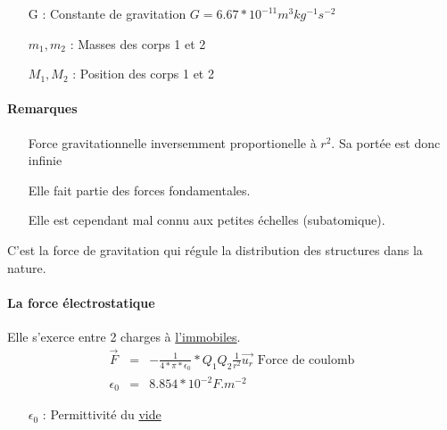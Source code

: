\begin{itemize}
	\item[G :] Constante de gravitation $G=6.67*10^{-11} m^3kg^{-1}s^{-2}$
	\item[$m_1, m_2$ :] Masses des corps 1 et 2
	\item[$M_1, M_2$ :] Position des corps 1 et 2
\end{itemize}

\paragraph{Remarques}

\begin{itemize}
	\item[] Force gravitationnelle inversemment proportionelle à $r^2$. Sa portée est donc infinie
	\item[] Elle fait partie des forces fondamentales.
	\item[] Elle est cependant mal connu aux petites échelles (subatomique).
\end{itemize}
C'est la force de gravitation qui régule la distribution des structures dans la nature.

\paragraph{La force électrostatique}
\begin{wrapfigure}{r}{0pt}
\end{wrapfigure}
Elle s'exerce entre 2 charges à \ul{l'immobiles}.
\[\begin{array}{rcl}
	\overrightarrow{F} &=& -\frac{1}{4*\pi*\epsilon_0}*{Q_1Q_2}\frac{1}{r^2}\vec{u_r} \text{ Force de coulomb}\\
	\epsilon_0 &=& 8.854*10^{-2} F.m ^{-2} 
\end{array}\]
\begin{itemize}
	\item[$\epsilon_0$ : ] Permittivité du \ul{vide}
\end{itemize}

